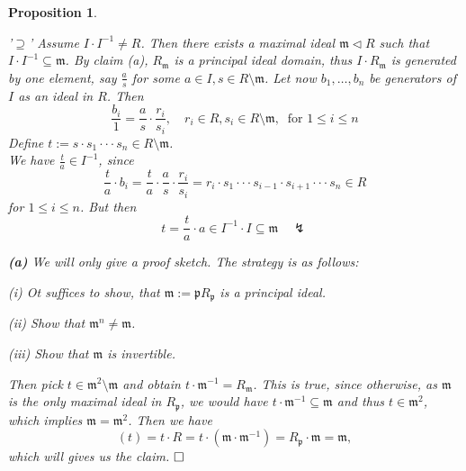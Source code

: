 \documentclass[11pt]{book}
\newtheorem{proposition}[theorem]{Proposition}
\theoremstyle{nonumberbreak}
\newenvironment{pr}[1][]{\ifthenelse{\equal{#1}{}}{\proof}{\proof[#1]}\rm}{\endproof}
\begin{document}
\begin{spacing}{1.3}
\begin{proposition}
\begin{pr}
\begin{compactenum}
\begin{compactitem}
\item['$\supseteq$'] Assume $I\cdot I^{-1} \neq R$. Then there exists a maximal ideal $\mathfrak{m}\triangleleft R$ such that $I\cdot I^{-1} \subseteq \mathfrak{m}$. By claim (a), $R_{\mathfrak{m}}$ is a principal ideal domain, thus $I\cdot R_{\mathfrak{m}}$ is generated by one element, say $\frac{a}{s}$ for some $a \in I, s \in R\setminus \mathfrak{m}$.
Let now $b_1, \ldots, b_n$ be generators of $I$ as an ideal in $R$. Then 
$$\frac{b_i}{1}=\frac{a}{s} \cdot \frac{r_i}{s_i}, \quad r_i \in R, s_i \in R\setminus \mathfrak{m}, \ \textrm{ for } 1 \leqslant i \leqslant n$$
Define $t:= s \cdot s_1 \cdot \cdot \cdot s_n \in R\setminus \mathfrak{m}$.\\
We have $\frac{t}{a} \in I^{-1}$, since
$$\frac{t}{a} \cdot b_i= \frac{t}{a} \cdot \frac{a}{s} \cdot \frac{r_i}{s_i}=r_i \cdot s_1 \cdot \cdot \cdot s_{i-1} \cdot s_{i+1} \cdot \cdot \cdot s_n \in R$$
for $1 \leqslant i \leqslant n$. But then 
$$t=\frac{t}{a} \cdot a \in I^{-1} \cdot I \subseteq \mathfrak{m} \quad \lightning$$
\end{compactitem}
\item[\textbf{(a)}] We will only give a proof sketch. The strategy is as follows:
\begin{compactenum}
\item[(i)] Ot suffices to show, that $\mathfrak{m}:=\mathfrak{p}R_{\mathfrak{p}}$ is a principal ideal.
\item[(ii)] Show that $\mathfrak{m}^n \neq \mathfrak{m}$.
\item[(iii)] Show that $\mathfrak{m}$ is invertible.
\end{compactenum}
Then pick $t \in \mathfrak{m}^2 \setminus \mathfrak{m}$ and obtain $t\cdot \mathfrak{m}^{-1}=R_{\mathfrak{m}}$. This is true, since otherwise, as $\mathfrak{m}$ is the only maximal ideal in $R_{\mathfrak{p}}$, we would have $t \cdot \mathfrak{m}^{-1} \subseteq \mathfrak{m}$ and thus $t \in \mathfrak{m}^2$, which implies $\mathfrak{m}=\mathfrak{m}^2$. Then we have
$$( t ) = t \cdot R = t \cdot (\mathfrak{m} \cdot \mathfrak{m}^{-1})=R_{\mathfrak{p}} \cdot \mathfrak{m} = \mathfrak{m},$$
which will gives us the claim. $\hfill \Box$
\end{compactenum}

\end{pr}
\end{proposition}





\end{spacing}
\end{document}
